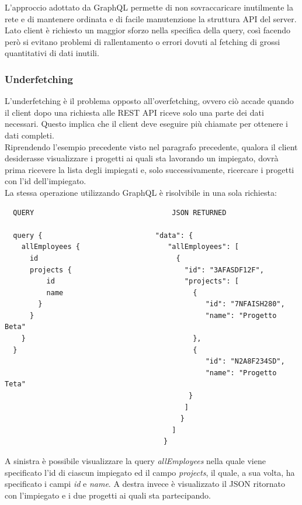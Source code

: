 L'approccio adottato da GraphQL permette di non sovraccaricare inutilmente la rete e di mantenere ordinata e di facile manutenzione la struttura API del server. Lato client è richiesto un maggior sforzo nella specifica della query, così facendo però si evitano problemi di rallentamento o errori dovuti al fetching di grossi quantitativi di dati inutili.
\subsubsection*{Underfetching}
L'underfetching è il problema opposto all'overfetching, ovvero ciò accade quando il client dopo una richiesta alle REST API riceve solo una parte dei dati necessari. Questo implica che il client deve eseguire più chiamate per ottenere i dati completi.\\
Riprendendo l'esempio precedente visto nel paragrafo precedente, qualora il client desiderasse visualizzare i progetti ai quali sta lavorando un impiegato, dovrà prima ricevere la lista degli impiegati e, solo successivamente, ricercare i progetti con l'id dell'impiegato.\\
La stessa operazione utilizzando GraphQL è risolvibile in una sola richiesta:
\begin{verbatim}
  QUERY                                 JSON RETURNED

  query {                           "data": {
    allEmployees {                     "allEmployees": [
      id                                 {
      projects {                           "id": "3AFASDF12F",
          id                               "projects": [
          name                               {
        }                                       "id": "7NFAISH280",
      }                                         "name": "Progetto Beta"
    }                                        },
  }                                          {
                                                "id": "N2A8F234SD",
                                                "name": "Progetto Teta"
                                            }
                                           ]
                                          }
                                        ]
                                      }
\end{verbatim}
A sinistra è possibile visualizzare la query \textit{allEmployees} nella quale viene specificato l'id di ciascun impiegato ed il campo \textit{projects}, il quale, a sua volta, ha specificato i campi \textit{id} e \textit{name}. A destra invece è visualizzato il JSON ritornato con l'impiegato e i due progetti ai quali sta partecipando.
